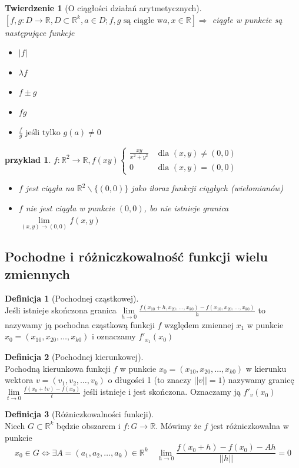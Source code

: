 \documentclass[12pt,a4paper]{article}
\newtheorem{tw}{Twierdzenie}
\newtheorem{przyklad}{przyklad}
\theoremstyle{definition}
\newtheorem{df}{Definicja}
\begin{document}
\begin{tw}[O ciągłości działań arytmetycznych]~\\
$[f,g: D\to \mathbb{R}, D\subset\mathbb{R}^k, a\in D; f,g \text{ są ciągłe w} a, x\in\mathbb{R}] \Rightarrow$ ciągłe w punkcie są następujące funkcje

\begin{itemize}
	\item $|f| $
	\item $\lambda f $
	\item $f \pm g $
	\item $fg$ 
	\item $\frac{f}{g} \text{ jeśli tylko } g(a) \neq 0$
\end{itemize}

\end{tw}
\begin{przyklad}
$ f:\mathbb{R}^2 \to\mathbb{R}, f(xy) \begin{cases} 
	\frac{xy}{x^2+y^2} & \text{ dla } (x,y) \neq (0,0)\\
	0 & \text{ dla } (x,y) = (0,0)
\end{cases}$\\

\begin{itemize}
	\item $f$ jest ciągła na $\mathbb{R}^2 \smallsetminus \{(0,0)\}$ jako iloraz funkcji ciągłych (wielomianów)
	\item $f$ nie jest ciągła w punkcie $(0,0)$, bo nie istnieje granica $\lim\limits_{(x,y)\to(0,0)}f(x,y)$
\end{itemize}
\end{przyklad}

\subsection{Pochodne i różniczkowalność funkcji wielu zmiennych}
\begin{df}[Pochodnej cząstkowej]~\\
Jeśli istnieje skończona granica $\lim\limits_{h\to 0} \frac{f(x_{10}+h, x_{20}, \dots, x_{k0})-f(x_{10}, x_{20}, \dots, x_{k0})}{h}$ to nazywamy ją pochodna cząstkową funkcji $f$ względem zmiennej $x_1$ w punkcie $x_0 = (x_{10}, x_{20}, \dots, x_{k0})$ i oznaczamy $f'_{x_1}(x_0)$		
\end{df}
\begin{df}[Pochodnej kierunkowej]~\\
Pochodną kierunkowa funkcji $f$ w punkcie $x_0 = (x_{10}, x_{20}, \dots, x_{k0})$ w kierunku wektora  $v = (v_{1}, v_{2}, \dots, v_{k})$ o długości 1 (to znaczy $||v|| = 1$) nazywamy granicę $\lim\limits_{t\to  0}\frac{f(x_0+tv) - f(x_0)}{t}$ jeśli istnieje i jest skończona. Oznaczamy ją $f'_v(x_0)$
\end{df}
\begin{df}[Różniczkowalności funkcji]~\\
Niech $G\subset \mathbb{R}^k$ będzie obszarem i $f:G\to \mathbb{R}$. Mówimy że $f$ jest różniczkowalna w punkcie $$x_0\in G \Leftrightarrow \exists A=(a_1, a_2, \dots, a_k) \in \mathbb{R}^k \quad \lim\limits
_{h\to 0}\frac{f(x_0+h)-f(x_0)-Ah}{||h||} = 0$$
\end{df}
\end{document}
